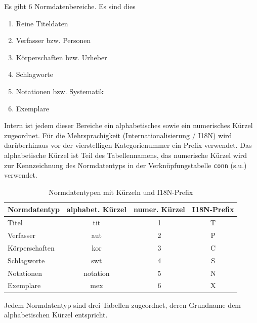 \documentclass[11pt, twoside, a4paper, BCOR8mm, DIV12, bibtotoc,idxtotoc]{scrbook}
\begin{document}
Es gibt 6 Normdatenbereiche. Es sind dies
\begin{enumerate}
\item Reine Titeldaten
\item Verfasser bzw. Personen
\item Körperschaften bzw. Urheber
\item Schlagworte
\item Notationen bzw. Systematik
\item Exemplare
\end{enumerate}

Intern ist jedem dieser Bereiche ein alphabetisches sowie ein
numerisches Kürzel zugeordnet. Für die Mehrsprachigkeit
(Internationalisierung / I18N) wird darüberhinaus vor der vierstelligen
Kategorienummer ein Prefix verwendet. Das alphabetische Kürzel ist
Teil des Tabellen\-namens, das numerische Kürzel wird zur
Kennzeichnung des Normdatentyps in der Verknüpfungs\-tabelle
\texttt{conn} (s.u.)  verwendet.

\begin{table}
  \begin{shadowenv}
    \vspace{3mm}
    \begin{center}
      \begin{tabular}[c]{lccc}
        Normdatentyp   & alphabet. Kürzel & numer. Kürzel & I18N-Prefix\\
        \hline
        Titel          & tit              & 1             & T\\
        Verfasser      & aut              & 2             & P\\
        Körperschaften & kor              & 3             & C\\
        Schlagworte    & swt              & 4             & S\\
        Notationen     & notation         & 5             & N\\
        Exemplare      & mex              & 6             & X\\
      \end{tabular}
    \end{center}
    \caption{Normdatentypen mit Kürzeln und I18N-Prefix\label{normkuerzprefix}}
    \vspace{3mm}
  \end{shadowenv}
\end{table}

Jedem Normdatentyp sind drei Tabellen zugeordnet, deren Grundname
dem alphabetischen Kürzel entspricht.
\end{document}
